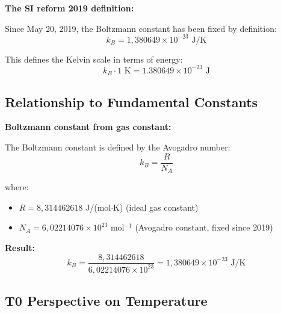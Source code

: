 	\begin{derivation}
		\textbf{The SI reform 2019 definition:}
		
		Since May 20, 2019, the Boltzmann constant has been fixed by definition:
		\begin{equation}
			\boxed{k_B = 1{,}380649 \times 10^{-23} \text{ J/K}}
			\label{eq:kb_si}
		\end{equation}
		
		This defines the Kelvin scale in terms of energy:
		\begin{equation}
			k_B \cdot 1 \text{ K} = 1.380649 \times 10^{-23} \text{ J}
		\end{equation}
	\end{derivation}
	
	\subsection{Relationship to Fundamental Constants}
	
	\begin{keyresult}
		\textbf{Boltzmann constant from gas constant:}
		
		The Boltzmann constant is defined by the Avogadro number:
		\begin{equation}
			k_B = \frac{R}{N_A}
		\end{equation}
		
		where:
		\begin{itemize}
			\item $R = 8{,}314462618$ J/(mol$\cdot$K) (ideal gas constant)
			\item $N_A = 6{,}02214076 \times 10^{23}$ mol$^{-1}$ (Avogadro constant, fixed since 2019)
		\end{itemize}
		
		\textbf{Result:}
		\begin{equation}
			k_B = \frac{8{,}314462618}{6{,}02214076 \times 10^{23}} = 1{,}380649 \times 10^{-23} \text{ J/K}
		\end{equation}
	\end{keyresult}
	
	\subsection{T0 Perspective on Temperature}
	
